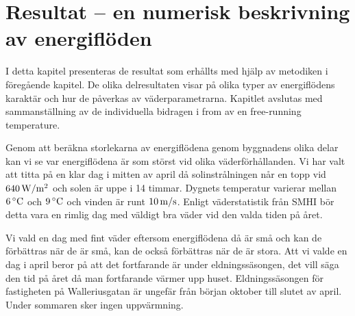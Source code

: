 \chapter{Resultat  –  en numerisk beskrivning av energiflöden}

I detta kapitel presenteras de resultat som erhållts med hjälp av metodiken i föregående kapitel. De olika delresultaten visar på olika typer av energiflödens karaktär och hur de påverkas av väderparametrarna. Kapitlet avslutas med sammanställning av de individuella bidragen i from av en free-running temperature.

Genom att beräkna storlekarna av energiflödena genom byggnadens olika delar kan vi se var energiflödena är som störst vid olika väderförhållanden. Vi har valt att titta på en klar dag i mitten av april då solinstrålningen når en topp vid $\unit[640]{W/m^2}$ och solen är uppe i 14 timmar. Dygnets temperatur varierar mellan $\unit[6]{^\circ C}$ och $\unit[9]{^\circ C}$ och vinden är runt $\unit[10]{m/s}$. Enligt väderstatistik från SMHI\cite{SMHIdata} bör detta vara en rimlig dag med väldigt bra väder vid den valda tiden på året.

Vi vald en dag med fint väder eftersom energiflödena då är små och kan de förbättras när de är små, kan de också förbättras när de är stora. Att vi valde en dag i april beror på att det fortfarande är under eldningssäsongen, det vill säga den tid på året då man fortfarande värmer upp huset. Eldningssäsongen för fastigheten på Walleriusgatan är ungefär från början oktober till slutet av april. Under sommaren sker ingen uppvärmning.













